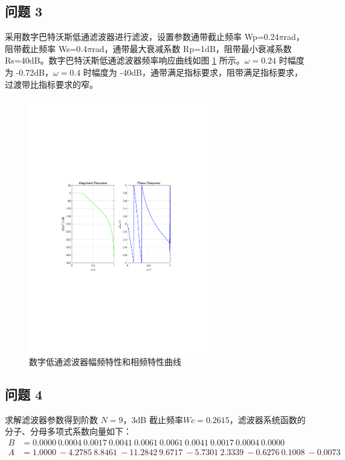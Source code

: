 \documentclass[12pt,AutoFakeBold]{article}
\begin{document}
\subsection{问题 3}

采用数字巴特沃斯低通滤波器进行滤波，设置参数通带截止频率 Wp=0.24$\pi$rad，阻带截止频率 Ws=0.4$\pi$rad，通带最大衰减系数 Rp=1dB，阻带最小衰减系数 Rs=40dB。数字巴特沃斯低通滤波器频率响应曲线如图 \ref{fig:LPBF} 所示。$\omega=0.24$ 时幅度为 -0.72dB，$\omega=0.4$ 时幅度为 -40dB，通带满足指标要求，阻带满足指标要求，过渡带比指标要求的窄。

\begin{figure}[htbp]
	\centering
	\includegraphics[width=0.7\textwidth]{figure/LPBF.pdf}
	\caption{数字低通滤波器幅频特性和相频特性曲线} \label{fig:LPBF}
\end{figure}

\subsection{问题 4}

求解滤波器参数得到阶数 $N=9$，3dB 截止频率$Wc=0.2615$，滤波器系统函数的分子、分母多项式系数向量如下：
%
\begin{align}
B &= 0.0000\ 0.0004\ 0.0017\ 0.0041\ 0.0061\ 0.0061\ 0.0041\ 0.0017\ 0.0004\ 0.0000 \\
A &= 1.0000\ -4.2785\ 8.8461\ -11.2842\ 9.6717\ -5.7301\ 2.3339\ -0.6276\ 0.1008\ -0.0073
\end{align}
\end{document}
